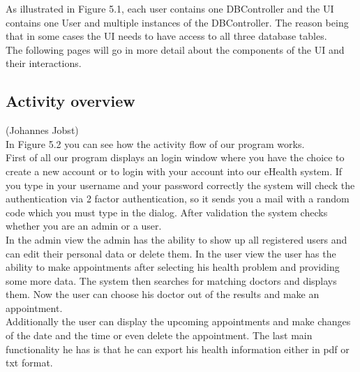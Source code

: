 \documentclass[a4paper, 12pt]{report}
\begin{document}
As illustrated in Figure 5.1, each user contains one DBController and the UI contains one User and multiple instances of the DBController. The reason being that in some cases the UI needs to have access to all three database tables.\\ The following pages will go in more detail about the components of the UI and their interactions.

\subsection{Activity overview}
{\tiny (Johannes Jobst)\\}
In Figure 5.2 you can see how the activity flow of our program works.\\
First of all our program displays an login window where you have the choice to create a new account or to login with your account into our eHealth system. If you type in your username and your password correctly the system will check the authentication via 2 factor authentication, so it sends you a mail with a random code which you must type in the dialog. After validation the system checks whether you are an admin or a user.\\
In the admin view the admin has the ability to show up all registered users and can edit their personal data or delete them.
In the user view the user has the ability to make appointments after selecting his health problem and providing some more data. The system then searches for matching doctors and displays them. Now the user can choose his doctor out of the results and make an appointment.\\
Additionally the user can display the upcoming appointments and make changes of the date and the time or even delete the appointment.
The last main functionality he has is that he can export his health information either in pdf or txt format.
\end{document}
